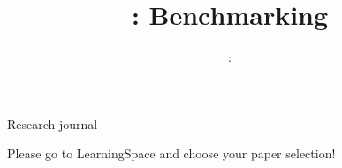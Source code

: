 \usepackage{../../beamerthemeFalmouthGamesAcademy}
\usepackage{multimedia}
\graphicspath{ {../../} }

\lstset{language=Python
}

\usepackage[normalem]{ulem}
\usepackage{wasysym}

\usepackage{algpseudocode}

\usepackage{pdfpages}

\usetikzlibrary{arrows,automata}




\title{\sessionnumber: Benchmarking}
\subtitle{\modulecode: \moduletitle}

\frame{\titlepage} 

\begin{frame}{Research journal}
    \begin{center}
        Please go to LearningSpace and choose your paper selection!
    \end{center}
\end{frame}





